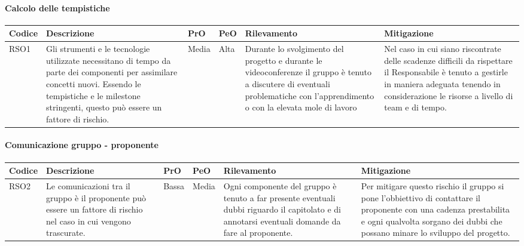 \paragraph{Calcolo delle tempistiche}
\begin{center}

	\begin{longtable}{p{1cm}|p{4cm}|p{0.7cm}|p{0.7cm}|p{3cm}|p{4cm}}
		\arrayrulecolor{white}
		\hline
		\rowcolor{blue!20}
		\textbf{Codice} & 
		\textbf{Descrizione} &
		\textbf{PrO}  &
		\textbf{PeO}  &				        
		\textbf{Rilevamento} &
		\textbf{Mitigazione} \\
		\hline			
		RSO1 & Gli strumenti e le tecnologie utilizzate necessitano di tempo da parte dei componenti per assimilare concetti nuovi. Essendo le tempistiche e le milestone stringenti, questo può essere un fattore di rischio. & Media & Alta & Durante lo svolgimento del progetto e durante le videoconferenze il gruppo è tenuto a discutere di eventuali problematiche con l'apprendimento o con la elevata mole di lavoro & Nel caso in cui siano riscontrate delle scadenze difficili da rispettare il Responsabile è tenuto a gestirle in maniera adeguata tenendo in considerazione le risorse a livello di team e di tempo. \\
		\end{longtable}
\end{center}
\paragraph{Comunicazione gruppo - proponente}
\begin{center}

	\begin{longtable}{p{1cm}|p{4cm}|p{0.7cm}|p{0.7cm}|p{3cm}|p{4cm}}
		\arrayrulecolor{white}
		\hline
		\rowcolor{blue!20}
		\textbf{Codice} & 
		\textbf{Descrizione} &
		\textbf{PrO}  &
		\textbf{PeO}  &				        
		\textbf{Rilevamento} &
		\textbf{Mitigazione} \\
		\hline	
		RSO2 & Le comunicazioni tra il gruppo è il proponente può essere un fattore di rischio nel caso in cui vengono trascurate. & Bassa & Media & Ogni componente del gruppo è tenuto a far presente eventuali dubbi riguardo il capitolato e di annotarsi eventuali domande da fare al proponente. & Per mitigare questo rischio il gruppo si pone l'obbiettivo di contattare il proponente con una cadenza prestabilita e ogni qualvolta sorgano dei dubbi che possano minare lo sviluppo del progetto.  \\
		\end{longtable}
\end{center}
\newpage
